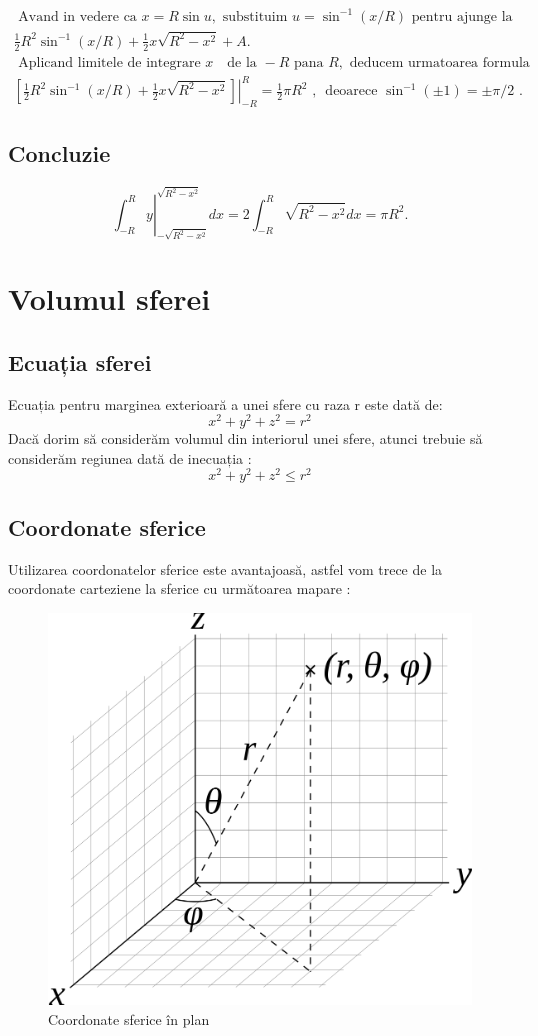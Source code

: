 \documentclass[12pt]{caltech_thesis}
\begin{document}
$$
\begin{array}{l}
\text { Avand in vedere ca } x=R \sin u, \text { substituim } u=\sin ^{-1}(x / R) \text { pentru  ajunge la  }\\
\frac{1}{2} R^{2} \sin ^{-1}(x / R)+\frac{1}{2} x \sqrt{R^{2}-x^{2}}+A. \\ \text { Aplicand limitele de integrare } x \text { }
\text { de la }-R \text { pana } R, \text { deducem  urmatoarea formula  }\\ \left.\left[\frac{1}{2} R^{2} \sin ^{-1}(x / R)+\frac{1}{2} x \sqrt{R^{2}-x^{2}}\right]\right|_{-R} ^{R}=\frac{1}{2} \pi R^{2} \text { , }
\text { deoarece } \sin ^{-1}(\pm 1)=\pm \pi / 2 \text { . }
\end{array}
$$

\section{Concluzie}
 
$$
\left.\int_{-R}^{R} y\right|_{-\sqrt{R^{2}-x^{2}}} ^{\sqrt{R^{2}-x^{2}}} d x=2 \int_{-R}^{R} \sqrt{R^{2}-x^{2}} d x=\pi R^{2} .
$$


\chapter{Volumul sferei}

\section{Ecuația sferei}

Ecuația pentru marginea exterioară a unei sfere cu raza r este dată de: $$ x^2 + y^2 + z^2 = r^2 $$ 
Dacă dorim să considerăm volumul din interiorul unei sfere, atunci trebuie să considerăm regiunea dată de inecuația \cite{university-of-washington-2013}:  $$x^2+y^2+z^2 \leq r^2 $$

\section{Coordonate sferice}

Utilizarea coordonatelor sferice este avantajoasă, astfel vom trece de la coordonate carteziene la sferice cu următoarea mapare \cite{spherical-coordinates}:

\begin{figure}[hbt!]
\centering
\includegraphics[width=.3\textwidth]{punct_coordonate_sferice.png}
\caption{Coordonate sferice în plan}\label{fig:logo}
\end{figure}
\end{document}
